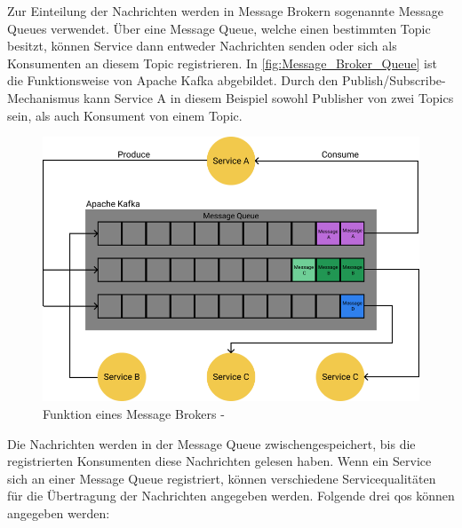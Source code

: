 Zur Einteilung der Nachrichten werden in Message Brokern sogenannte Message Queues verwendet. Über eine Message Queue, welche einen bestimmten Topic besitzt, können Service dann entweder Nachrichten senden oder sich als Konsumenten an diesem Topic registrieren. In \autoref{fig:Message_Broker_Queue} ist die Funktionsweise von Apache Kafka abgebildet. Durch den Publish/Subscribe-Mechanismus kann Service A in diesem Beispiel sowohl Publisher von zwei Topics sein, als auch Konsument von einem Topic.

\begin{figure}[H]
    \centering
    \includegraphics[width=0.65\linewidth]{images/apache-kafka.png}
    \caption{Funktion eines Message Brokers - \cite{MichaelSchwab.2019}}
    \label{fig:Message_Broker_Queue}
\end{figure}

Die Nachrichten werden in der Message Queue zwischengespeichert, bis die registrierten Konsumenten diese Nachrichten gelesen haben. Wenn ein Service sich an einer Message Queue registriert, können verschiedene Servicequalitäten für die Übertragung der Nachrichten angegeben werden. Folgende drei \glqq \gls{qos}\grqq{} können angegeben werden: \cite{ApacheSoftwareFoundation.2021}

